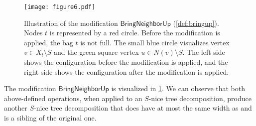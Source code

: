 \documentclass[a4paper,UKenglish,cleveref, autoref, thm-restate, numberwithinsect]{lipics-v2021}
\newcounter{modification}
\newcommand{\BringNeighborUp}{\mathsf{BringNeighborUp}}
\begin{document}
\begin{figure}[t]
\centering
\texttt{[image: figure6.pdf]}
    \caption{Illustration of the modification $\BringNeighborUp$ (\cref{def:bringup}). Nodes $t$ is represented by a red circle. Before the modification is applied, the bag $t$ is not full. The small blue circle visualizes vertex $v\in X_t\setminus S$ and the green square vertex $u\in N(v)\setminus S$. The left side shows the configuration before the modification is applied, and the right side shows the configuration after the modification is applied.}\label{fig:bringneighbor}
\end{figure}
The modification $\BringNeighborUp$ is visualized in \cref{fig:bringneighbor}. We can observe that both above-defined operations, when applied to an $S$-nice tree decomposition, produce another $S$-nice tree decomposition that does have at most the same width as and is a sibling of the original one. 
\end{document}
